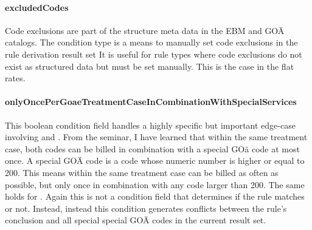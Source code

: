 \paragraph{excludedCodes}
Code exclusions are part of the structure meta data in the EBM and GOÄ catalogs.
The \excludedCodes condition type is a means to manually set code exclusions in the rule derivation result set
It is useful for rule types where code exclusions do not exist as structured data but must be set manually.
This is the case in the flat rates.

\paragraph{onlyOncePerGoaeTreatmentCaseInCombinationWithSpecialServices}
This boolean condition field handles a highly specific but important edge-case involving  and .
From the \PVC seminar, I have learned that within the same treatment case, both codes can be billed in combination with a special GOä code at most once.
A special GOÄ code is a code whose numeric number is higher or equal to 200.
This means within the same treatment case  can be billed as often as possible, but only once in combination with any code larger than 200.
The same holds for .
Again this is not a condition field that determines if the rule matches or not.
Instead, instead this condition generates conflicts between the rule's conclusion and all special special GOÄ codes in the current result set.
